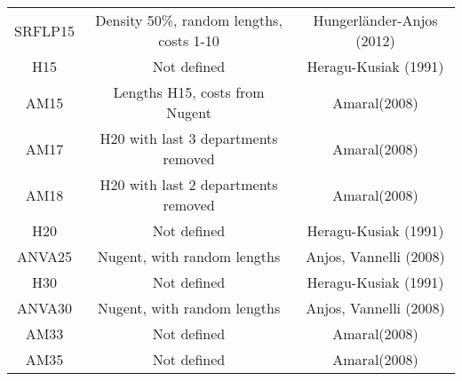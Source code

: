 \documentclass[a4paper]{article}
\begin{document}
\begin{table}
\begin{tabular}{c|c|c}
        SRFLP15 & Density 50\%, random lengths, costs 1-10 & Hungerländer-Anjos (2012) \\
        H15 & Not defined & Heragu-Kusiak (1991) \\
        AM15 & Lengths H15, costs from Nugent & Amaral(2008) \\
        AM17 & H20 with last 3 departments removed & Amaral(2008) \\
        AM18 & H20 with last 2 departments removed & Amaral(2008) \\
        H20 & Not defined & Heragu-Kusiak (1991) \\
        ANVA25 & Nugent, with random lengths & Anjos, Vannelli (2008) \\
        H30 & Not defined & Heragu-Kusiak (1991) \\
        ANVA30 & Nugent, with random lengths & Anjos, Vannelli (2008) \\
        AM33 & Not defined & Amaral(2008) \\
        AM35 & Not defined & Amaral(2008) 
    \end{tabular}
\end{table}
\end{document}
